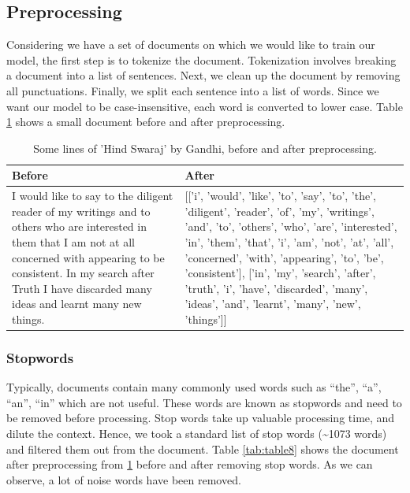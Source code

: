 \documentclass[twoside]{article}
\begin{document}
\subsection{Preprocessing}
Considering we have a set of documents on which we would like to train our model, the first step is to tokenize the document. Tokenization involves breaking a document into a list of sentences. Next, we clean up the document by removing all punctuations. Finally, we split each sentence into a list of words. Since we want our model to be case-insensitive, each word is converted to lower case. Table \ref{tab:table7} shows a small document before and after preprocessing.
\begin{table}[h!]
  \begin{center}
    \begin{tabular}{p{7cm} p{7cm}}
      \toprule
      \textbf{Before} & \textbf{After}  \\ 
      \midrule
      I would like to say to the diligent reader of my writings and to others who are
interested in them that I am not at all concerned with appearing to be
consistent. In my search after Truth I have discarded many ideas and learnt
many new things. & [['i', 'would', 'like', 'to', 'say', 'to', 'the', 'diligent', 'reader', 'of', 'my', 'writings', 'and', 'to', 'others', 'who', 'are', 'interested', 'in', 'them', 'that', 'i', 'am', 'not', 'at', 'all', 'concerned', 'with', 'appearing', 'to', 'be', 'consistent'], ['in', 'my', 'search', 'after', 'truth', 'i', 'have', 'discarded', 'many', 'ideas', 'and', 'learnt', 'many', 'new', 'things']] \\
    \bottomrule
    \end{tabular}
    \caption{Some lines of 'Hind Swaraj' by Gandhi, before and after preprocessing.}
    \label{tab:table7}
  \end{center}
\end{table}


\subsubsection{Stopwords}
Typically, documents contain many commonly used words such as “the”, “a”, “an”, “in” which are not useful. These words are known as stopwords and need to be removed before processing. Stop words take up valuable processing time, and dilute the context. Hence, we took a standard list of stop words (\textasciitilde1073 words) and filtered them out from the document. Table \ref{tab:table8} shows the document after preprocessing from \ref{tab:table7} before and after removing stop words. As we can observe, a lot of noise words have been removed.
\end{document}
